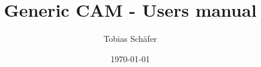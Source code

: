 \documentclass[a4paper,12pt,twoside,fleqn]{report}
\begin{document}
\title{Generic CAM - Users manual}
\author{Tobias Sch{\"a}fer}

\date{\today}

\maketitle
\pagestyle{empty}
\cleardoublepage

\tableofcontents

%

\newpage
{}
\pagestyle{headings}
\setcounter{page}{1}








%
%
\end{document}
